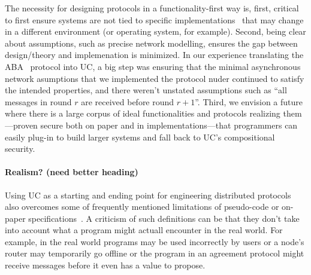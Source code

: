 The necessity for designing protocols in a functionality-first way is, first, critical to first ensure systems are not tied to specific implementations~\cite{farsiteretro,farsite} that may change in a different environment (or operating system, for example).
Second, being clear about assumptions, such as precise network modelling, ensures the gap between design/theory and implemenation is minimized. 
In our experience translating the ABA~\cite{ABA} protocol into UC, a big step was ensuring that the minimal asynchronous network asumptions that we implemented the protocol nuder continued to satisfy the intended properties, and there weren't unstated assumptions such as ``all messages in round $r$ are received before round $r+1$''.
Third, we envision a future where there is a large corpus of ideal functionalities and protocols realizing them---proven secure both on paper and in implementations---that programmers can easily plug-in to build larger systems and fall back to UC's compositional security.


\paragraph{Realism? (need better heading)}
Using UC as a starting and ending point for engineering distributed protocols also overcomes some of frequently mentioned limitations of pseudo-code or on-paper specifications~\cite{paxosthoughts}.
A criticism of such definitions can be that they don't take into account what a program might actuall encounter in the real world.
For example, in the real world programs may be used incorrectly by users or a node's router may temporarily go offline or the program in an agreement protocol might receive messages before it even has a value to propose. 


